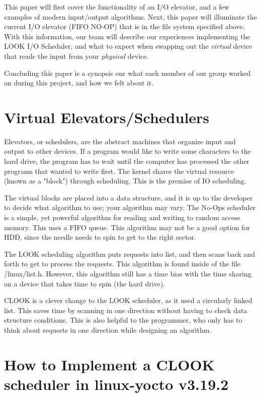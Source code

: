 \documentclass[onecolumn, draftclsnofoot,10pt, compsoc]{IEEEtran}
\begin{document}
		 This paper will first cover the functionality of an I/O elevator, and a few examples of modern input/output algorithms. 
		 Next, this paper will illuminate the current I/O elevator (FIFO NO-OP) that is in the file system specified above. 
		 With this information, our team will describe our experiences implementing the LOOK I/O Scheduler, and what to expect when swapping out the \textit{virtual} device that reads the input from your \textit{physical} device.

		 Concluding this paper is a synopsis our what each member of our group worked on during this project, and how we felt about it.


		 \section{Virtual Elevators/Schedulers}
            Elevators, or schedulers, are the abstract machines that organize input and output to other devices. If a program would like to write some characters to the hard drive, the program has to wait until the computer has processed the other programs that wanted to write first. The kernel shares the virtual resource (known as a "block") through scheduling. This is the premise of IO scheduling.

            The virtual blocks are placed into a data structure, and it is up to the developer to decide what algorithm to use; your algorithm may vary.
            The No-Ops scheduler is a simple, yet powerful algorithm for reading and writing to random access memory. This uses a FIFO queue. This algorithm may not be a good option for HDD, since the needle needs to spin to get to the right sector. 

            The LOOK scheduling algorithm puts requests into list, and then scans back and forth to get to process the requests. This algorithm is found inside of the file /linux/list.h. However, this algorithm still has a time bias with the time sharing on a device that takes time to spin (the hard drive).

            CLOOK is a clever change to the LOOK scheduler, as it used a circularly linked list. This saves time by scanning in one direction without having to check data structure conditions. This is also helpful to the programmer, who only has to think about requests in one direction while designing an algorithm.

       \section{How to Implement a CLOOK scheduler in linux-yocto v3.19.2} 
\end{document}
